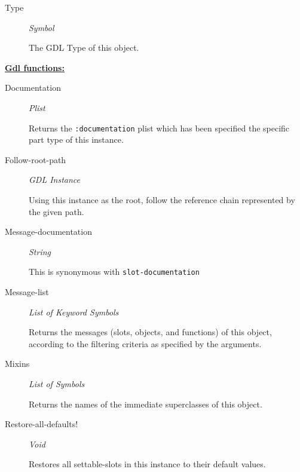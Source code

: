 \documentclass [11pt]{book}
\begin{document}
\begin{itemize}
\begin{description}
\item [Type]
\emph{Symbol}

 The GDL Type of this object.




\end{description}






\textbf{
\underline{Gdl functions:}}

\begin{description}

\item [Documentation]
\emph{Plist}

 Returns the \texttt{:documentation} plist which has been specified the
specific part type of this instance.




\item [Follow-root-path]
\emph{GDL Instance}

 Using this instance as the root, follow the reference chain
represented by the given path.




\item [Message-documentation]
\emph{String}

 This is synonymous with \texttt{slot-documentation}




\item [Message-list]
\emph{List of Keyword Symbols}

 Returns the messages (slots, objects, and functions) of this object, according to the filtering criteria as specified by the arguments.




\item [Mixins]
\emph{List of Symbols}

 Returns the names of the immediate superclasses of this object.




\item [Restore-all-defaults!]
\emph{Void}

 Restores all settable-slots in this instance to their default values.





\end{description}
\end{itemize}
\end{document}
